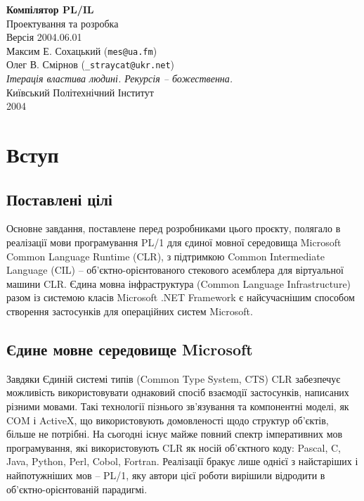 \documentclass{memoir}
\begin{document}
\begin{center}
    \vspace*{1cm}
    {\Large \textbf{Компілятор PL/IL}}\\[0.5cm]
    {\large Проектування та розробка}\\[1cm]
    
    {\normalsize Версія 2004.06.01}\\[0.3cm]
    {\normalsize Максим Е. Сохацький (\texttt{mes@ua.fm})}\\
    {\normalsize Олег В. Смірнов (\texttt{\_straycat@ukr.net})}\\[0.5cm]
    
    \vspace{0.5cm}
    {\itshape Ітерація властива людині. Рекурсія – божественна.}\\[1cm]
    
    {\normalsize Київський Політехнічний Інститут}\\
    {\normalsize 2004}
\end{center}

\newpage
\tableofcontents

\newpage

\chapter{Вступ}
\section{Поставлені цілі}
Основне завдання, поставлене перед розробниками цього проєкту,
полягало в реалізації мови програмування PL/1 для єдиної мовної
середовища Microsoft Common Language Runtime (CLR), з підтримкою
Common Intermediate Language (CIL) – об’єктно-орієнтованого стекового
асемблера для віртуальної машини CLR. Єдина мовна інфраструктура (Common
Language Infrastructure) разом із системою класів Microsoft .NET Framework
є найсучаснішим способом створення застосунків для операційних систем Microsoft.

\section{Єдине мовне середовище Microsoft}
Завдяки Єдиній системі типів (Common Type System, CTS) CLR забезпечує можливість
використовувати однаковий спосіб взаємодії застосунків, написаних різними мовами.
Такі технології пізнього зв’язування та компонентні моделі, як COM і ActiveX,
що використовують домовленості щодо структур об’єктів, більше не потрібні.
На сьогодні існує майже повний спектр імперативних мов програмування,
які використовують CLR як носій об’єктного коду: Pascal, C, Java, Python,
Perl, Cobol, Fortran. Реалізації бракує лише однієї з найстаріших і
найпотужніших мов – PL/1, яку автори цієї роботи вирішили відродити
в об’єктно-орієнтованій парадигмі.
\end{document}
